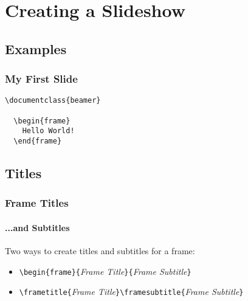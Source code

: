 \section{Creating a Slideshow}
\subsection{Examples}
\begin{frame}[fragile]
\frametitle{My First Slide}
  \begin{footnotesize}
    \begin{verbatim}
\documentclass{beamer}

  \begin{frame}
    Hello World!
  \end{frame}

    \end{verbatim}
  \end{footnotesize}
\end{frame}
\subsection{Titles}
\begin{frame}[fragile]
\frametitle{Frame Titles}
\framesubtitle{...and Subtitles}

  Two ways to create titles and subtitles for a frame:

  \begin{itemize}
    \item \verb|\begin{frame}{|\emph{Frame Title}\verb|}{|\emph{Frame Subtitle}\verb|}|
    \item \verb|\frametitle{|\emph{Frame Title}\verb|}\framesubtitle{|\emph{Frame Subtitle}\verb|}|
  \end{itemize}

\end{frame}
